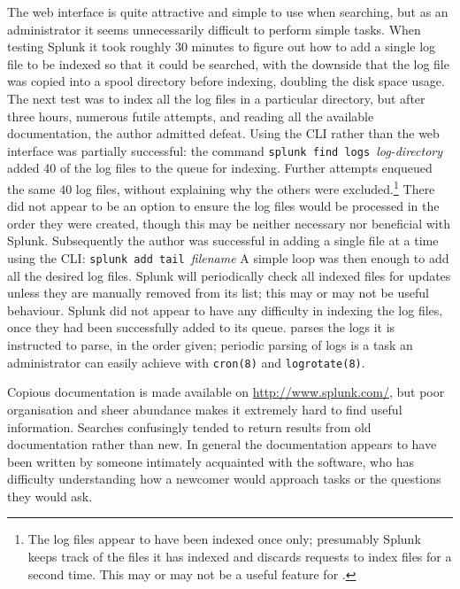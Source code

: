 The web interface is quite attractive and simple to use when searching, but
as an administrator it seems unnecessarily difficult to perform simple
tasks.  When testing Splunk it took roughly 30 minutes to figure out how to
add a single log file to be indexed so that it could be searched, with the
downside that the log file was copied into a spool directory before
indexing, doubling the disk space usage.  The next test was to index all
the log files in a particular directory, but after three hours, numerous
futile attempts, and reading all the available documentation, the author
admitted defeat.  Using the \gls{CLI} rather than the web interface was
partially successful: the command \newline{} \tab{} \texttt{splunk find
logs }\textit{log-directory\/}\newline{} added 40 of the
\numberOFlogFILES{} log files to the queue for indexing.  Further attempts
enqueued the same 40 log files, without explaining why the others were
excluded.\footnote{The log files appear to have been indexed once only;
presumably Splunk keeps track of the files it has indexed and discards
requests to index files for a second time.  This may or may not be a useful
feature for \parsername{}.} There did not appear to be an option to ensure
the log files would be processed in the order they were created, though
this may be neither necessary nor beneficial with Splunk.  Subsequently the
author was successful in adding a single file at a time using the
\gls{CLI}:\newline{} \tab{} \texttt{splunk add tail
}\textit{filename\/}\newline{} A simple loop was then enough to add all the
desired log files.  Splunk will periodically check all indexed files for
updates unless they are manually removed from its list; this may or may not
be useful behaviour.  Splunk did not appear to have any difficulty in
indexing the log files, once they had been successfully added to its queue.
\parsername{} parses the logs it is instructed to parse, in the order
given; periodic parsing of logs is a task an administrator can easily
achieve with \texttt{cron(8)} and \texttt{logrotate(8)}.

Copious documentation is made available on \url{http://www.splunk.com/},
but poor organisation and sheer abundance makes it extremely hard to find
useful information.  Searches confusingly tended to return results from old
documentation rather than new.  In general the documentation appears to
have been written by someone intimately acquainted with the software, who
has difficulty understanding how a newcomer would approach tasks or the
questions they would ask.

